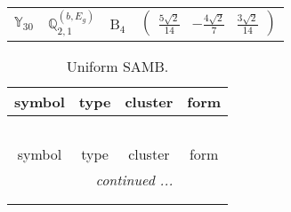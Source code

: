 \documentclass[fleqn,10pt,landscape]{article}
\begin{document}
\begin{itemize}
\begin{center}
\begin{longtable}{c|c|c|c}
$ \mathbb{Y}_{30} $ & $\mathbb{Q}_{2,1}^{(b,E_{g})}$ & B$_{4}$ & $\begin{pmatrix} \frac{5 \sqrt{2}}{14} & - \frac{4 \sqrt{2}}{7} & \frac{3 \sqrt{2}}{14} \end{pmatrix}$ \\
\end{longtable}
\end{center}
\begin{center}
\renewcommand{\arraystretch}{1.3}
\begin{longtable}{c|c|c|c}
\caption{Uniform SAMB.}
 \\
 \hline \hline
symbol & type & cluster & form \\ \hline \endfirsthead

\multicolumn{3}{l}{\tablename\ \thetable{}} \\
 \hline \hline
symbol & type & cluster & form \\ \hline \endhead

 \hline \hline
\multicolumn{3}{r}{\footnotesize\it continued ...} \\ \endfoot

 \hline \hline
\multicolumn{3}{r}{} \\ \endlastfoot


\end{longtable}
\end{center}
\end{itemize}
\end{document}
